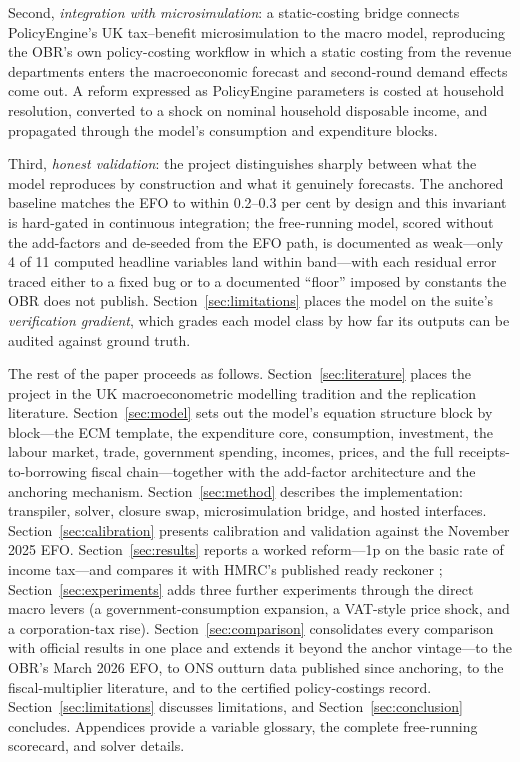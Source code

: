 Second, \emph{integration with microsimulation}: a static-costing bridge connects PolicyEngine's UK tax--benefit microsimulation \citep{policyengine} to the macro model, reproducing the OBR's own policy-costing workflow \citep{obr2014costings} in which a static costing from the revenue departments enters the macroeconomic forecast and second-round demand effects come out. A reform expressed as PolicyEngine parameters is costed at household resolution, converted to a shock on nominal household disposable income, and propagated through the model's consumption and expenditure blocks.

Third, \emph{honest validation}: the project distinguishes sharply between what the model reproduces by construction and what it genuinely forecasts. The anchored baseline matches the EFO to within 0.2--0.3 per cent by design and this invariant is hard-gated in continuous integration; the free-running model, scored without the add-factors and de-seeded from the EFO path, is documented as weak---only 4 of 11 computed headline variables land within band---with each residual error traced either to a fixed bug or to a documented ``floor'' imposed by constants the OBR does not publish. Section~\ref{sec:limitations} places the model on the suite's \emph{verification gradient}, which grades each model class by how far its outputs can be audited against ground truth.

The rest of the paper proceeds as follows. Section~\ref{sec:literature} places the project in the UK macroeconometric modelling tradition and the replication literature. Section~\ref{sec:model} sets out the model's equation structure block by block---the ECM template, the expenditure core, consumption, investment, the labour market, trade, government spending, incomes, prices, and the full receipts-to-borrowing fiscal chain---together with the add-factor architecture and the anchoring mechanism. Section~\ref{sec:method} describes the implementation: transpiler, solver, closure swap, microsimulation bridge, and hosted interfaces. Section~\ref{sec:calibration} presents calibration and validation against the November 2025 EFO. Section~\ref{sec:results} reports a worked reform---1p on the basic rate of income tax---and compares it with HMRC's published ready reckoner \citep{hmrc2025reckoner}; Section~\ref{sec:experiments} adds three further experiments through the direct macro levers (a government-consumption expansion, a VAT-style price shock, and a corporation-tax rise). Section~\ref{sec:comparison} consolidates every comparison with official results in one place and extends it beyond the anchor vintage---to the OBR's March 2026 EFO, to ONS outturn data published since anchoring, to the fiscal-multiplier literature, and to the certified policy-costings record. Section~\ref{sec:limitations} discusses limitations, and Section~\ref{sec:conclusion} concludes. Appendices provide a variable glossary, the complete free-running scorecard, and solver details.
